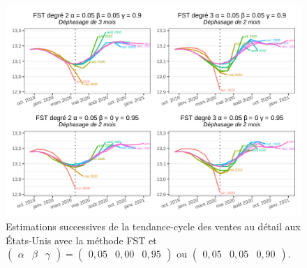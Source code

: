 \documentclass[
  12pt,
  french,
  12pt,a4paper]{article}
\newcommand\1{\mathds{1}}
\begin{document}
\begin{figure}

{\centering \includegraphics[width=0.9\linewidth]{img/nber/retailx_fstp1} 

}

\caption[Estimations successives de la tendance-cycle des ventes au détail aux États-Unis avec la méthode FST et \(\begin{pmatrix}\alpha&\beta&\gamma\end{pmatrix} = \begin{pmatrix}0,05 &0,00&0,95\end{pmatrix}\) ou \(\begin{pmatrix}0,05 &0,05&0,90\end{pmatrix}\)]{Estimations successives de la tendance-cycle des ventes au détail aux États-Unis avec la méthode FST et \(\begin{pmatrix}\alpha&\beta&\gamma\end{pmatrix} = \begin{pmatrix}0,05 &0,00&0,95\end{pmatrix}\) ou \(\begin{pmatrix}0,05 &0,05&0,90\end{pmatrix}\).}\label{fig:retailxfst1}

\footnotesize
\normalsize\end{figure}
\end{document}
